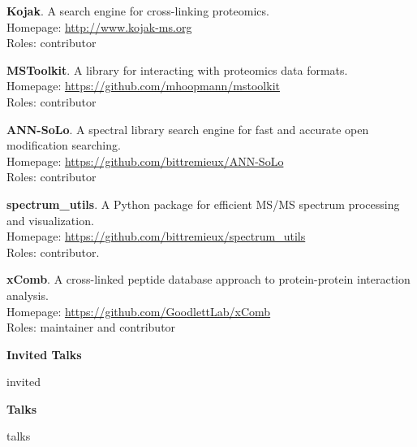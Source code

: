 \documentclass[11pt]{article}
\newcommand{\mysection}[1]{\vspace{1ex} \textbf{\large \textsf{#1} \quad \hrulefill}}
\newcommand{\myref}[1]{\href{#1}{\url{#1}}}
\begin{document}
\begin{etaremune}
  \item \textbf{Kojak}. A search engine for cross-linking proteomics. \\
  Homepage: \myref{http://www.kojak-ms.org} \\
  Roles: contributor

  \item \textbf{MSToolkit}. A library for interacting with proteomics data formats. \\
  Homepage: \myref{https://github.com/mhoopmann/mstoolkit} \\
  Roles: contributor

  \item \textbf{ANN-SoLo}. A spectral library search engine for fast and
  accurate open modification searching. \\
  Homepage: \myref{https://github.com/bittremieux/ANN-SoLo} \\
  Roles: contributor
   
  \item \textbf{spectrum\_utils}. A Python package for efficient MS/MS spectrum
  processing and visualization. \\
  Homepage: \myref{https://github.com/bittremieux/spectrum_utils} \\
  Roles: contributor.

  \item \textbf{xComb}. A cross-linked peptide database approach to
  protein-protein interaction analysis. \\
  Homepage: \myref{https://github.com/GoodlettLab/xComb} \\
  Roles: maintainer and contributor

\end{etaremune}

\mysection{Invited Talks}
\begin{etaremune}
{{ invited }}
\end{etaremune}

\mysection{Talks}
\begin{etaremune}
{{ talks }}
\end{etaremune}



\end{document}
